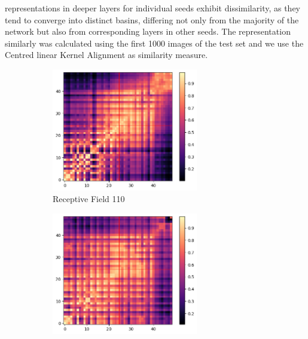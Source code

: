 representations in deeper layers for individual seeds exhibit dissimilarity, as they tend to converge into distinct
basins, differing not only from the majority of the network but also from corresponding layers in other seeds. The representation
 similarly was calculated using the first 1000 images of the test set and we use the Centred linear Kernel Alignment
 \citep{kornblithSimilarityNeuralNetwork2019} as similarity measure.
\begin{figure}[!htp]
        \centering
        \begin{subfigure}[b]{0.475\textwidth}
            \centering
            \includegraphics[width=0.7\textwidth]{images/resnet50_level1_similarity_cifar10.png}
            \caption[Network1]%
            {{\small Receptive Field 110}}    
            \label{fig:similarity_lvl1}
        \end{subfigure}
        \hfill
        \begin{subfigure}[b]{0.475\textwidth}  
            \centering 
            \includegraphics[width=0.7\textwidth]{images/resnet50_level2_similarity_cifar10.png}

\end{subfigure}
\end{figure}
